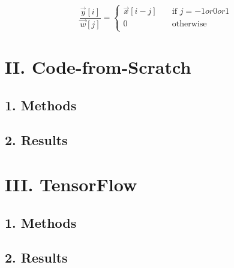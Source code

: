 \begin{description}
\begin{equation}
	\frac{\vec{y}[i]}{\vec{w}[j]} =
	\begin{cases}
			\vec{x}[i-j]	& 	\quad \text{if } j = -1 or 0 or 1 \\
			0				& 	\quad \text{otherwise} \\
		\end{cases}
\end{equation}
\end{description}

\newpage
\section*{\Large II. Code-from-Scratch}

\subsection*{\large 1. Methods}

\subsection*{\large 2. Results}

\newpage
\section*{\Large III. TensorFlow}

\subsection*{\large 1. Methods}

\subsection*{\large 2. Results}




\clearpage

%
%
%



